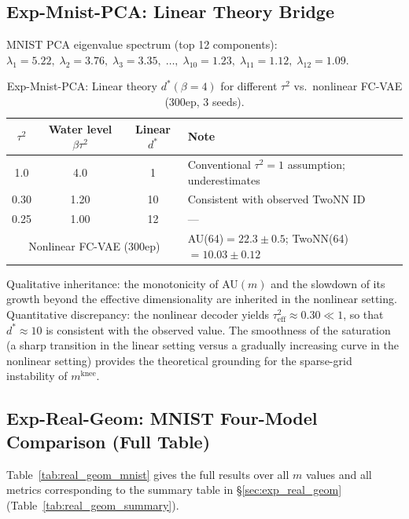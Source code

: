 \documentclass[make,article,submit,pdftex,moreauthors]{Definitions/mdpi}
\newcommand{\mknee}{m^{\mathrm{knee}}}
\begin{document}
\subsection*{Exp-Mnist-PCA: Linear Theory Bridge}

MNIST PCA eigenvalue spectrum (top 12 components):
$\lambda_1=5.22,\; \lambda_2=3.76,\; \lambda_3=3.35,\;\ldots,\;\lambda_{10}=1.23,\; \lambda_{11}=1.12,\; \lambda_{12}=1.09$.

\begin{table}[H]
\centering
\caption{Exp-Mnist-PCA: Linear theory $d^*(\beta=4)$ for different $\tau^2$ vs.\ nonlinear FC-VAE (300ep, 3 seeds).}
\label{tab:theory_pred}
\small
\begin{tabular}{ccc|l}
\toprule
$\tau^2$ & Water level $\beta\tau^2$ & Linear $d^*$ & Note \\
\midrule
1.0  & 4.0  & 1   & Conventional $\tau^2=1$ assumption; underestimates \\
0.30 & 1.20 & 10  & Consistent with observed TwoNN ID \\
0.25 & 1.00 & 12  & --- \\
\midrule
\multicolumn{3}{c|}{Nonlinear FC-VAE (300ep)} & AU(64)$=22.3\pm0.5$; TwoNN(64)$=10.03\pm0.12$ \\
\bottomrule
\end{tabular}
\end{table}

Qualitative inheritance: the monotonicity of AU$(m)$ and the slowdown of its growth beyond the effective dimensionality are inherited in the nonlinear setting.
Quantitative discrepancy: the nonlinear decoder yields $\tau^2_\mathrm{eff} \approx 0.30 \ll 1$, so that $d^* \approx 10$ is consistent with the observed value.
The smoothness of the saturation (a sharp transition in the linear setting versus a gradually increasing curve in the nonlinear setting) provides the theoretical grounding for the sparse-grid instability of $\mknee$.

\subsection*{Exp-Real-Geom: MNIST Four-Model Comparison (Full Table)}

Table~\ref{tab:real_geom_mnist} gives the full results over all $m$ values and
all metrics corresponding to the summary table in \S\ref{sec:exp_real_geom}
(Table~\ref{tab:real_geom_summary}).
\end{document}
